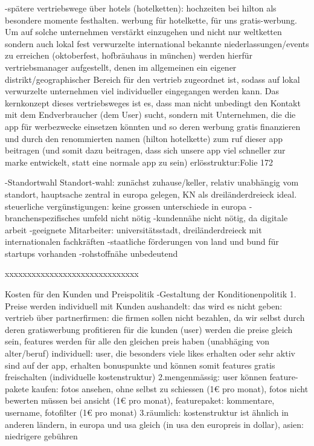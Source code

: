  -spätere vertriebswege über hotels (hotelketten): hochzeiten bei hilton als besondere momente festhalten.
 werbung für hotelkette, für uns gratis-werbung. Um auf solche unternehmen verstärkt einzugehen und nicht nur weltketten
 sondern auch lokal fest verwurzelte international bekannte niederlassungen/events zu erreichen (oktoberfest, hofbräuhaus in münchen)
 werden hierfür vertriebsmanager aufgestellt, denen im allgemeinen ein eigener distrikt/geographischer Bereich für den vertrieb zugeordnet ist,
 sodass auf lokal verwurzelte unternehmen viel individueller eingegangen werden kann. 
 Das kernkonzept dieses vertriebsweges ist es, dass man nicht unbedingt den Kontakt mit dem Endverbraucher (dem User) sucht, sondern mit Unternehmen,
 die die app für werbezwecke einsetzen könnten und so deren werbung gratis finanzieren und durch den renommierten namen (hilton hotelkette) zum
 ruf dieser app beitragen (und somit dazu beitragen, dass sich unsere app viel schneller zur marke entwickelt, statt eine normale app zu sein)
 erlösstruktur:Folie 172
 
 -Standortwahl
Standort-wahl: zunächst zuhause/keller, relativ unabhängig vom standort, hauptsache zentral in europa gelegen, KN als dreiländerdreieck ideal.
steuerliche vergünstigungen: keine grossen unterschiede in europa
-branchenspezifisches umfeld nicht nötig
-kundennähe nicht nötig, da digitale arbeit
-geeignete Mitarbeiter: universitätsstadt, dreiländerdreieck mit internationalen fachkräften
-staatliche förderungen von land und bund für startups vorhanden
-rohstoffnähe unbedeutend

 xxxxxxxxxxxxxxxxxxxxxxxxxxxxxx
 


Kosten für den Kunden und Preispolitik
-Gestaltung der Konditionenpolitik
1. Preise werden individuell mit Kunden aushandelt:
das wird es nicht geben:
vertrieb über partnerfirmen: die firmen sollen nicht bezahlen, da wir selbst durch deren gratiswerbung profitieren
für die kunden (user) werden die preise gleich sein, features werden für alle den gleichen preis haben (unabhäging von alter/beruf)
individuell: user, die besonders viele likes erhalten oder sehr aktiv sind auf der app, erhalten bonuspunkte und können somit features gratis freischalten (individuelle kostenstruktur)
2.mengenmässig: user können feature-pakete kaufen: fotos ansehen, ohne selbst zu schiessen (1€ pro monat), fotos nicht bewerten müssen bei ansicht (1€ pro monat), featurepaket: kommentare, username, fotofilter (1€ pro monat)
3.räumlich: kostenstruktur ist ähnlich in anderen ländern, in europa und usa gleich (in usa den europreis in dollar), asien: niedrigere gebühren


